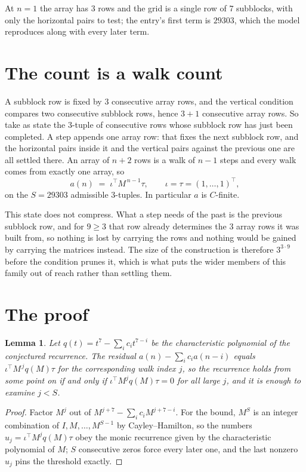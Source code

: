 \documentclass[11pt,a4paper]{article}
\theoremstyle{plain}
\newtheorem{lemma}[theorem]{Lemma}
\theoremstyle{definition}
\begin{document}
At $n=1$ the array has $3$ rows and the grid is a single row of $7$
subblocks, with only the horizontal pairs to test; the entry's first term is
$29303$, which the model reproduces along with every later term.

\section{The count is a walk count}

A subblock row is fixed by $3$ consecutive array rows, and the vertical condition compares
two consecutive subblock rows, hence $3+1$ consecutive array rows. So take as state the
$3$-tuple of consecutive rows whose subblock row has just been completed. A step appends one
array row: that fixes the next subblock row, and the horizontal pairs inside it and the
vertical pairs against the previous one are all settled there. An array of $n+2$ rows is
a walk of $n-1$ steps and every walk comes from exactly one array, so
\[
a(n)\;=\;\iota^{\!\top}M^{\,n-1}\tau,\qquad\iota=\tau=(1,\dots,1)^{\!\top},
\]
on the $S=29303$ admissible $3$-tuples. In particular $a$ is $C$-finite.

This state does not compress. What a step needs of the past is the previous subblock row, and
for $9\ge3$ that row already determines the $3$ array rows it was built from, so nothing
is lost by carrying the rows and nothing would be gained by carrying the matrices instead. The
size of the construction is therefore $3^{3\cdot9}$ before the condition prunes
it, which is what puts the wider members of this family out of reach rather than settling them.

\section{The proof}

\begin{lemma}\label{lem:crit}
Let $q(t)=t^{7}-\sum_i c_it^{7-i}$ be the characteristic polynomial of the
conjectured recurrence. The residual $a(n)-\sum_ic_ia(n-i)$ equals
$\iota^{\!\top}M^{\,j}q(M)\tau$ for the corresponding walk index $j$, so the recurrence
holds from some point on if and only if $\iota^{\!\top}M^{j}q(M)\tau=0$ for all large $j$,
and it is enough to examine $j<S$.
\end{lemma}

\begin{proof}
Factor $M^{j}$ out of $M^{j+7}-\sum_ic_iM^{j+7-i}$. For the bound, $M^{S}$
is an integer combination of $I,M,\dots,M^{S-1}$ by Cayley--Hamilton, so the numbers
$u_j=\iota^{\!\top}M^{j}q(M)\tau$ obey the monic recurrence given by the characteristic
polynomial of $M$; $S$ consecutive zeros force every later one, and the last nonzero $u_j$
pins the threshold exactly.
\end{proof}
\end{document}
